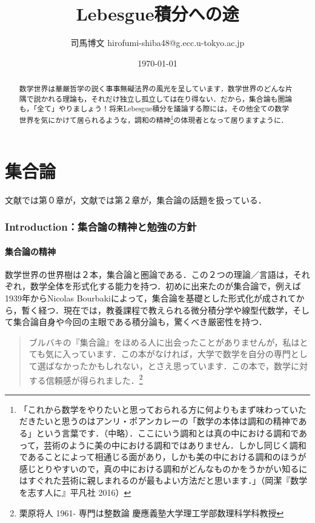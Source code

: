 \documentclass[uplatex, 12pt, a4paper, dvipdfmx]{jsarticle}
\title{Lebesgue積分への途}
\author{司馬博文 hirofumi-shiba48@g.ecc.u-tokyo.ac.jp}
\date{\today}
\begin{document}
\maketitle
\begin{abstract}
	数学世界は華厳哲学の説く事事無礙法界の風光を呈しています．数学世界のどんな片隅で説かれる理論も，それだけ独立し孤立しては在り得ない．だから，集合論も圏論も，「全て」やりましょう！将来Lebesgue積分を議論する際には，その他全ての数学世界を気にかけて居られるような，調和の精神\footnote{「これから数学をやりたいと思っておられる方に何よりもまず味わっていただきたいと思うのはアンリ・ポアンカレーの「数学の本体は調和の精神である」という言葉です．（中略）．ここにいう調和とは真の中における調和であって，芸術のように美の中における調和ではありません．しかし同じく調和であることによって相通じる面があり，しかも美の中における調和のほうが感じとりやすいので，真の中における調和がどんなものかをうかがい知るにはすぐれた芸術に親しまれるのが最もよい方法だと思います．」（岡潔『数学を志す人に』平凡社 2016）}の体現者となって居りますように．
\end{abstract}
\tableofcontents\clearpage

\part{集合論}

文献\cite{須之内治男}では第０章が，文献\cite{吉田洋一}では第２章が，集合論の話題を扱っている．

\section{Introduction：集合論の精神と勉強の方針}

\subsection{集合論の精神}

数学世界の世界樹は２本，集合論と圏論である．この２つの理論／言語は，それぞれ，数学全体を形式化する能力を持つ．初めに出来たのが集合論で，例えば1939年からNicolas Bourbakiによって，集合論を基礎とした形式化が成されてから，暫く経つ．現在では，教養課程で教えられる微分積分学や線型代数学，そして集合論自身や今回の主眼である積分論も，驚くべき厳密性を持つ．\par

\begin{quote}
	ブルバキの『集合論』をほめる人に出会ったことがありませんが，私はとても気に入っています．この本がなければ，大学で数学を自分の専門として選ばなかったかもしれない，とさえ思っています．この本で，数学に対する信頼感が得られました．\footnote{栗原将人 1961- 専門は整数論 慶應義塾大学理工学部数理科学科教授}
\end{quote}
\end{document}

